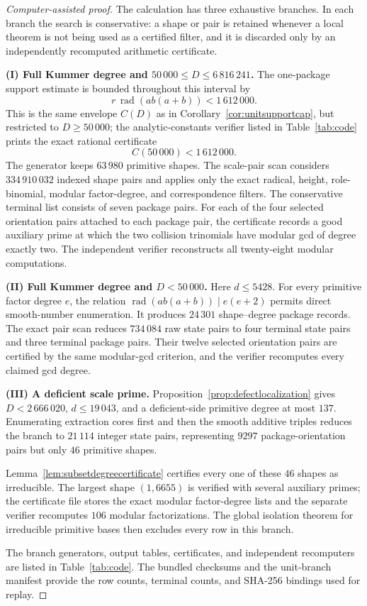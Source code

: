 \documentclass[11pt]{article}
\numberwithin{equation}{section}
\theoremstyle{definition}
\begin{document}
\begin{proof}[Computer-assisted proof]
The calculation has three exhaustive branches.  In each branch the search is
conservative: a shape or pair is retained whenever a local theorem is not
being used as a certified filter, and it is discarded only by an independently
recomputed arithmetic certificate.

\smallskip
\noindent\textbf{(I) Full Kummer degree and \(50\,000\leq D\leq6\,816\,241\).}
The one-package support estimate is bounded throughout this interval by
\[
 r\,\operatorname{rad}(ab(a+b))<1\,612\,000.
\]
This is the same envelope \(C(D)\) as in Corollary~\ref{cor:unitsupportcap},
but restricted to \(D\geq50\,000\); the analytic-constants verifier listed in
Table~\ref{tab:code} prints the exact rational certificate
\[
 C(50\,000)<1\,612\,000.
\]
The generator keeps \(63\,980\) primitive shapes.  The scale-pair scan
considers \(334\,910\,032\) indexed shape pairs and applies
only the exact radical, height, role-binomial, modular factor-degree, and
correspondence filters.  The conservative terminal list consists of seven
package pairs.  For each of the four selected orientation pairs attached to
each package pair, the certificate records a good auxiliary prime at which the
two collision trinomials have modular gcd of degree exactly two.  The
independent verifier reconstructs all twenty-eight modular computations.

\smallskip
\noindent\textbf{(II) Full Kummer degree and \(D<50\,000\).}
Here \(d\leq5428\).  For every primitive factor degree \(e\), the relation
\(\operatorname{rad}(ab(a+b))\mid e(e+2)\) permits direct smooth-number
enumeration.  It produces \(24\,301\) shape--degree package records.  The
exact pair scan reduces \(734\,084\) raw state pairs to four terminal state
pairs and three terminal package pairs.  Their twelve selected orientation
pairs are certified by the same modular-gcd
criterion, and the verifier recomputes every claimed gcd degree.

\smallskip
\noindent\textbf{(III) A deficient scale prime.}
Proposition~\ref{prop:defectlocalization} gives
\(D<2\,666\,020\), \(d\leq19\,043\), and a deficient-side primitive degree
at most \(137\).  Enumerating extraction cores first and then the smooth
additive triples reduces the branch to \(21\,114\) integer state pairs,
representing \(9297\) package-orientation pairs but only \(46\) primitive
shapes.

Lemma~\ref{lem:subsetdegreecertificate} certifies every one of these
\(46\) shapes as irreducible.  The largest shape \((1,6655)\) is verified
with several auxiliary primes; the certificate file stores the exact modular
factor-degree lists and the separate verifier recomputes \(106\) modular
factorizations.  The global isolation theorem for irreducible primitive bases
then excludes every row in this branch.

The branch generators, output tables, certificates, and independent
recomputers are listed in Table~\ref{tab:code}.  The bundled checksums and
the unit-branch manifest provide the row counts, terminal counts, and
SHA-256 bindings used for replay.
\end{proof}
\end{document}
